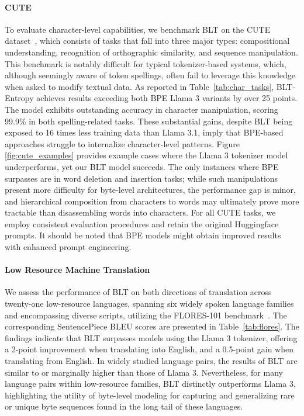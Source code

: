 \paragraph{CUTE}
To evaluate character-level capabilities, we benchmark {\textsc BLT} on the CUTE dataset~\citep{edman2024cute}, which consists of tasks that fall into three major types: compositional understanding, recognition of orthographic similarity, and sequence manipulation. This benchmark is notably difficult for typical tokenizer-based systems, which, although seemingly aware of token spellings, often fail to leverage this knowledge when asked to modify textual data. As reported in Table~\ref{tab:char_tasks}, {\textsc BLT}-Entropy achieves results exceeding both BPE Llama 3 variants by over 25 points. The model exhibits outstanding accuracy in character manipulation, scoring 99.9\% in both spelling-related tasks. These substantial gains, despite {\textsc BLT} being exposed to 16 times less training data than Llama 3.1, imply that BPE-based approaches struggle to internalize character-level patterns. Figure \ref{fig:cute_examples} provides example cases where the Llama 3 tokenizer model underperforms, yet our {\textsc BLT} model succeeds. The only instances where BPE surpasses are in word deletion and insertion tasks; while such manipulations present more difficulty for byte-level architectures, the performance gap is minor, and hierarchical composition from characters to words may ultimately prove more tractable than disassembling words into characters. For all CUTE tasks, we employ consistent evaluation procedures and retain the original Huggingface prompts. It should be noted that BPE models might obtain improved results with enhanced prompt engineering.

\paragraph{Low Resource Machine Translation} We assess the performance of {\textsc BLT} on both directions of translation across twenty-one low-resource languages, spanning six widely spoken language families and encompassing diverse scripts, utilizing the FLORES-101 benchmark~\citep{goyal2022flores}. The corresponding SentencePiece BLEU scores are presented in Table~\ref{tab:flores}. The findings indicate that {\textsc BLT} surpasses models using the Llama 3 tokenizer, offering a 2-point improvement when translating into English, and a 0.5-point gain when translating from English. In widely studied language pairs, the results of {\textsc BLT} are similar to or marginally higher than those of Llama 3. Nevertheless, for many language pairs within low-resource families, {\textsc BLT} distinctly outperforms Llama 3, highlighting the utility of byte-level modeling for capturing and generalizing rare or unique byte sequences found in the long tail of these languages.

